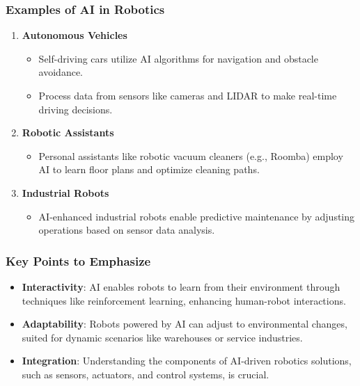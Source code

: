 \documentclass[aspectratio=169]{beamer}
\begin{document}
\begin{frame}[fragile]
    \frametitle{Examples of AI in Robotics}
    \begin{enumerate}
        \item \textbf{Autonomous Vehicles}
        \begin{itemize}
            \item Self-driving cars utilize AI algorithms for navigation and obstacle avoidance.
            \item Process data from sensors like cameras and LIDAR to make real-time driving decisions.
        \end{itemize}
        \item \textbf{Robotic Assistants}
        \begin{itemize}
            \item Personal assistants like robotic vacuum cleaners (e.g., Roomba) employ AI to learn floor plans and optimize cleaning paths.
        \end{itemize}
        \item \textbf{Industrial Robots}
        \begin{itemize}
            \item AI-enhanced industrial robots enable predictive maintenance by adjusting operations based on sensor data analysis.
        \end{itemize}
    \end{enumerate}
\end{frame}

\begin{frame}[fragile]
    \frametitle{Key Points to Emphasize}
    \begin{itemize}
        \item \textbf{Interactivity}: AI enables robots to learn from their environment through techniques like reinforcement learning, enhancing human-robot interactions.
        \item \textbf{Adaptability}: Robots powered by AI can adjust to environmental changes, suited for dynamic scenarios like warehouses or service industries.
        \item \textbf{Integration}: Understanding the components of AI-driven robotics solutions, such as sensors, actuators, and control systems, is crucial.
    \end{itemize}
\end{frame}
\end{document}
